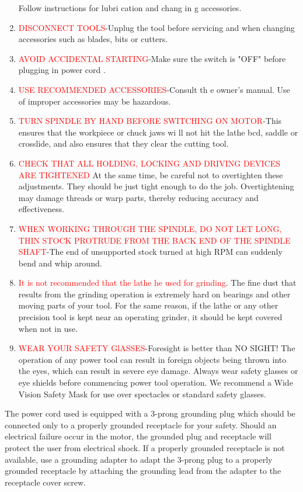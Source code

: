 \begin{enumerate}
Follow instructions for lubri cation and chang in g
accessories.
\item\textcolor{Red}{DISCONNECT TOOLS}-Unplug the tool before
servicing and when changing accessories such as
blades, bits or cutters.
\item\textcolor{Red}{AVOID ACCIDENTAL STARTING}-Make sure the
switch is "OFF" before plugging in power cord .
\item\textcolor{Red}{USE RECOMMENDED ACCESSORIES}-Consult th e
owner's manual. Use of improper accessories may
be hazardous.
\item\textcolor{Red}{TURN SPINDLE BY HAND BEFORE SWITCHING ON
MOTOR}-This ensures that the workpiece or chuck
jaws wi ll not hit the lathe bcd, saddle or crosslide,
and also ensures that they clear the cutting tool.
\item\textcolor{Red}{CHECK THAT ALL HOLDING, LOCKING AND DRIVING
DEVICES ARE TIGHTENED} At the same time, be careful
not to overtighten these adjustments. They should
be just tight enough to do the job. Overtightening
may damage threads or warp parts, thereby reducing
accuracy and effectiveness.
\item\textcolor{Red}{WHEN WORKING THROUGH THE SPINDLE, DO NOT LET
LONG, THIN STOCK PROTRUDE FROM THE BACK END OF
THE SPINDLE SHAFT}-The end of unsupported stock
turned at high RPM can suddenly bend and whip
around.
\item\textcolor{Red}{It is not recommended that the lathe he used for grinding}.
The fine dust that results from the grinding operation is extremely hard on
bearings and other moving parts of your tool. For the same reason, if the lathe
or any other precision tool is kept near an operating grinder, it should be kept
covered when not in use.

\item\textcolor{Red}{WEAR YOUR SAFETY GlASSES}-Foresight is better than NO
SIGHT! The operation of any power tool can result in foreign objects being
thrown into the eyes, which can result in severe eye damage. Always wear safety
glasses or eye shields before commencing power tool operation. We recommend a
Wide Vision Safety Mask for use over spectacles or standard safety glasses.

\end{enumerate}


The power cord used is equipped with a 3-prong grounding plug which should be
connected only to a properly grounded receptacle for your safety.
Should an electrical failure occur in the motor, the grounded plug and
receptacle will protect the user from electrical shock. If a properly grounded
receptacle is not available, use a grounding adapter to adapt the 3-prong plug
to a properly grounded receptacle by attaching the grounding lead from the
adapter to the receptacle cover screw.


